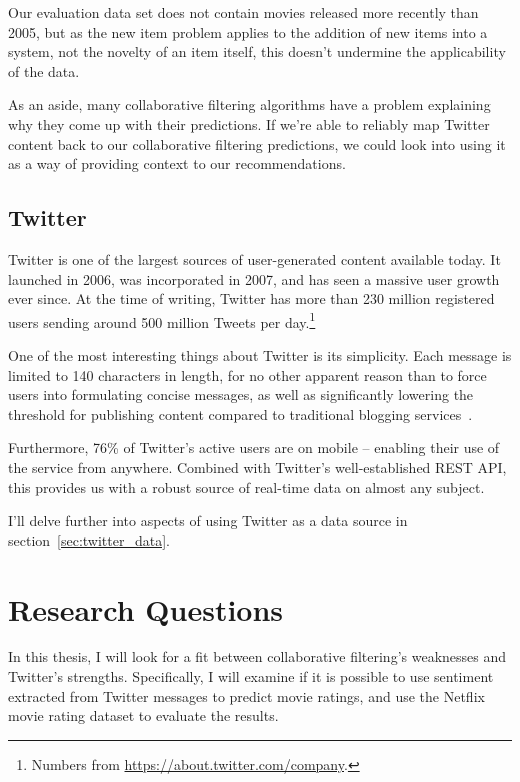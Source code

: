 Our evaluation data set does not contain movies released more recently than 2005, but as the new item problem applies to the addition of new items into a system, not the novelty of an item itself, this doesn't undermine the applicability of the data.

As an aside, many collaborative filtering algorithms have a problem explaining why they come up with their predictions. If we're able to reliably map Twitter content back to our collaborative filtering predictions, we could look into using it as a way of providing context to our recommendations.

\subsection{Twitter}

Twitter is one of the largest sources of user-generated content available today. It launched in 2006, was incorporated in 2007, and has seen a massive user growth ever since. At the time of writing, Twitter has more than 230 million registered users sending around 500 million Tweets per day.\footnote{Numbers from \url{https://about.twitter.com/company}.}

One of the most interesting things about Twitter is its simplicity. Each message is limited to 140 characters in length, for no other apparent reason than to force users into formulating concise messages, as well as significantly lowering the threshold for publishing content compared to traditional blogging services~\cite{Java:2007:WWT:1348549.1348556}.

Furthermore, 76\% of Twitter's active users are on mobile -- enabling their use of the service from anywhere. Combined with Twitter's well-established REST API, this provides us with a robust source of real-time data on almost any subject.

I'll delve further into aspects of using Twitter as a data source in section~\ref{sec:twitter_data}.

\section{Research Questions}

In this thesis, I will look for a fit between collaborative filtering's weaknesses and Twitter's strengths. Specifically, I will examine if it is possible to use sentiment extracted from Twitter messages to predict movie ratings, and use the Netflix movie rating dataset to evaluate the results.

